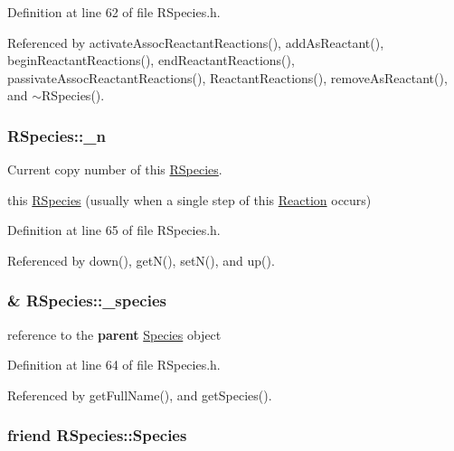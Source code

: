 Definition at line 62 of file R\+Species.\+h.



Referenced by activate\+Assoc\+Reactant\+Reactions(), add\+As\+Reactant(), begin\+Reactant\+Reactions(), end\+Reactant\+Reactions(), passivate\+Assoc\+Reactant\+Reactions(), Reactant\+Reactions(), remove\+As\+Reactant(), and $\sim$\+R\+Species().

\hypertarget{classRSpecies_a3c247ef50a25db875d0f657e6a2505ca}{
\subsubsection[{\+\_\+n}]{ R\+Species\+::\+\_\+n\hspace{0.3cm}{\ttfamily [private]}}}\label{classRSpecies_a3c247ef50a25db875d0f657e6a2505ca}


Current copy number of this \hyperlink{classRSpecies}{R\+Species}. 

this \hyperlink{classRSpecies}{R\+Species} (usually when a single step of this \hyperlink{classReaction}{Reaction} occurs) 

Definition at line 65 of file R\+Species.\+h.



Referenced by down(), get\+N(), set\+N(), and up().

\hypertarget{classRSpecies_a884cfd77555cd6f783ef95289a87f8a5}{
\subsubsection[{\+\_\+species}]{\& R\+Species\+::\+\_\+species\hspace{0.3cm}{\ttfamily [private]}}}\label{classRSpecies_a884cfd77555cd6f783ef95289a87f8a5}


reference to the {\bfseries parent} \hyperlink{classSpecies}{Species} object 



Definition at line 64 of file R\+Species.\+h.



Referenced by get\+Full\+Name(), and get\+Species().

\hypertarget{classRSpecies_a533594d731cf6ec10a4d7321b1213cc5}{
\subsubsection[{Species}]{\setlength{\rightskip}{0pt plus 5cm}friend R\+Species\+::\+Species\hspace{0.3cm}{\ttfamily [private]}}}\label{classRSpecies_a533594d731cf6ec10a4d7321b1213cc5}


